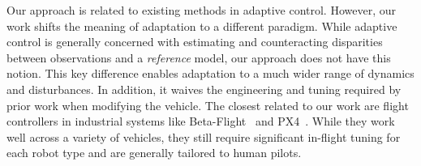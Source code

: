 Our approach is related to existing methods in adaptive control.
%
However, our work shifts the meaning of adaptation to a different paradigm.
%
While adaptive control is generally concerned with estimating and counteracting disparities between observations and a \emph{reference} model, our approach does not have this notion. %
%
This key difference enables adaptation to a much wider range of dynamics and disturbances.
%
In addition, it waives the engineering and tuning required by prior work when modifying the vehicle.
%
%
The closest related to our work are flight controllers in industrial systems like Beta-Flight~\cite{BetaFlight} and PX4~\cite{PX4}.
%
While they work well across a variety of vehicles, they still require significant in-flight tuning for each robot type and are generally tailored to human pilots.
%
